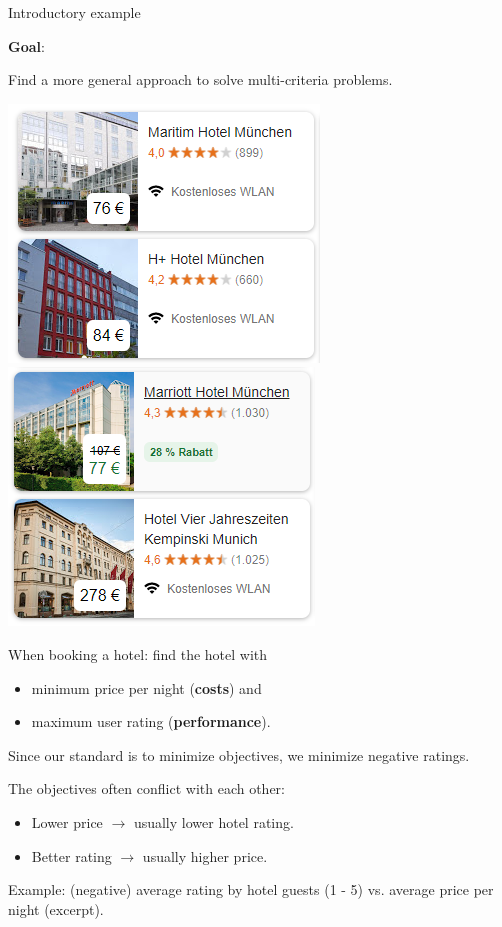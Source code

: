 \begin{frame}[allowframebreaks]{Introductory example}
\vspace*{0.5cm}

\textbf{Goal}:

Find a more general approach to solve multi-criteria problems.


\begin{center}
\includegraphics[width = 0.35\linewidth]{images/booking1.png} ~~~ \includegraphics[width = 0.35\linewidth]{images/booking2.png}
\end{center}

When booking a hotel: find the hotel with

\begin{itemize}
\item minimum price per night (\textbf{costs}) and
\item maximum user rating (\textbf{performance}).
\end{itemize}

\vfill

\begin{footnotesize}
Since our standard is to minimize objectives, we minimize negative ratings.
\end{footnotesize}

\framebreak

The objectives often conflict with each other:

\begin{itemize}
\item Lower price $\to$ usually lower hotel rating.
\item Better rating $\to$ usually higher price.
\end{itemize}

Example: (negative) average rating by hotel guests (1 - 5) vs. average price per night (excerpt).


\end{frame}
